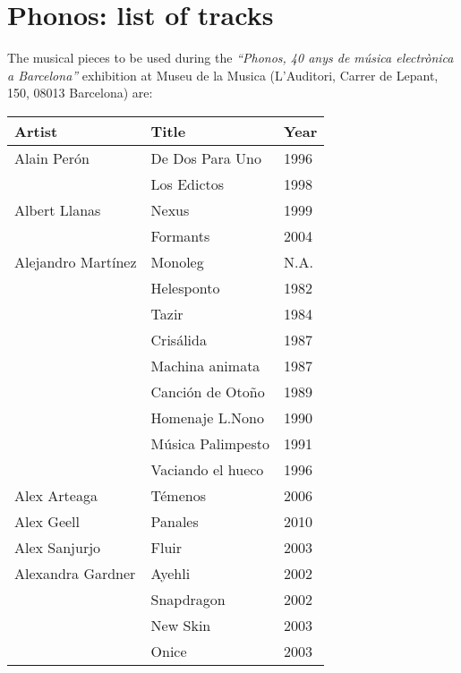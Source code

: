\chapter{Phonos: list of tracks} 

\label{AppendixC} 


The musical pieces to be used during the \textit{``Phonos, 40 anys de música electrònica a Barcelona''} exhibition at Museu de la Musica (L'Auditori, Carrer de Lepant, 150, 08013 Barcelona) are: 

\begin{center}
\begin{longtable}{ p{}  p{}  p{} } 
\textbf{Artist} & \textbf{Title} & \textbf{Year} \\ \toprule
Alain Perón & De Dos Para Uno & 1996 \\ \cmidrule(r){2-3}
& Los Edictos & 1998 \\ \midrule 
Albert Llanas & Nexus & 1999 \\ \cmidrule (r){2-3}
& Formants & 2004 \\ \midrule 
Alejandro Martínez & Monoleg & N.A. \\ \cmidrule (r){2-3}
& Helesponto & 1982 \\ \cmidrule (r){2-3}
& Tazir & 1984 \\ \cmidrule (r){2-3}
& Crisálida & 1987 \\ \cmidrule (r){2-3} 
& Machina animata & 1987 \\ \cmidrule (r){2-3} 
& Canción de Otoño & 1989 \\ \cmidrule (r){2-3} 
& Homenaje L.Nono & 1990 \\ \cmidrule (r){2-3} 
& Música Palimpesto & 1991 \\ \cmidrule (r){2-3} 
& Vaciando el hueco & 1996 \\ \midrule  
Alex Arteaga & Témenos & 2006 \\ \midrule 
Alex Geell & Panales & 2010 \\ \midrule 
Alex Sanjurjo & Fluir & 2003 \\ \midrule \midrule 
Alexandra Gardner & Ayehli & 2002 \\ \cmidrule (r){2-3}  
& Snapdragon & 2002 \\ \cmidrule (r){2-3}   
& New Skin & 2003 \\ \cmidrule (r){2-3}   
& Onice & 2003 \\ \cmidrule (r){2-3}   

\end{longtable}
\end{center}
